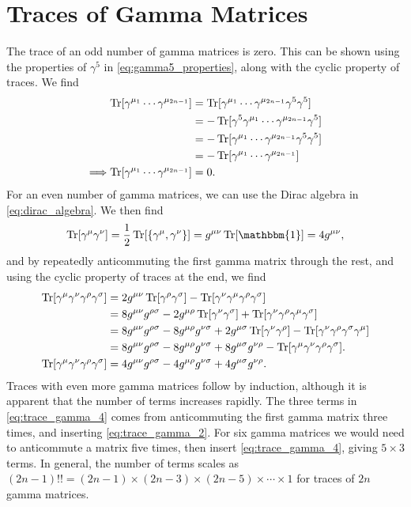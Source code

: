 \section{Traces of Gamma Matrices}\label{app:gamma_traces}
The trace of an odd number of gamma matrices is zero. This can be shown using the properties of $\gamma^5$ in \cref{eq:gamma5_properties}, along with the cyclic property of traces. We find
\begin{align}
    \operatorname{Tr}[\gamma^{\mu_1}\cdots\gamma^{\mu_{2n-1}}] &= \operatorname{Tr}[\gamma^{\mu_1}\cdots\gamma^{\mu_{2n-1}}\gamma^5\gamma^5]
    \nonumber \\
    &= -\operatorname{Tr}[\gamma^5\gamma^{\mu_1}\cdots\gamma^{\mu_{2n-1}}\gamma^5]
    \nonumber \\
    &= -\operatorname{Tr}[\gamma^{\mu_1}\cdots\gamma^{\mu_{2n-1}}\gamma^5\gamma^5]
    \nonumber \\
    &= -\operatorname{Tr}[\gamma^{\mu_1}\cdots\gamma^{\mu_{2n-1}}]
    \nonumber \\
    \Longrightarrow \operatorname{Tr}[\gamma^{\mu_1}\cdots\gamma^{\mu_{2n-1}}] &= 0.
\end{align}
For an even number of gamma matrices, we can use the Dirac algebra in \cref{eq:dirac_algebra}. We then find
\begin{equation}\label{eq:trace_gamma_2}
    \Tr[\gamma^\mu\gamma^\nu] = \frac{1}{2}\Tr[\{\gamma^\mu,\gamma^\nu\}] = g^{\mu\nu} \Tr[\mathbbm{1}] = 4g^{\mu\nu},
\end{equation}
and by repeatedly anticommuting the first gamma matrix through the rest, and using the cyclic property of traces at the end, we find
\begin{align}
    \operatorname{Tr}[\gamma^\mu\gamma^\nu\gamma^\rho\gamma^\sigma] &= 2g^{\mu\nu}\operatorname{Tr}[\gamma^\rho\gamma^\sigma] - \operatorname{Tr}[\gamma^\nu\gamma^\mu\gamma^\rho\gamma^\sigma]
    \nonumber \\
    &= 8g^{\mu\nu}g^{\rho\sigma} - 2g^{\mu\rho}\operatorname{Tr}[\gamma^\nu\gamma^\sigma] + \operatorname{Tr}[\gamma^\nu\gamma^\rho\gamma^\mu\gamma^\sigma]
    \nonumber \\
    &= 8g^{\mu\nu}g^{\rho\sigma} - 8g^{\mu\rho}g^{\nu\sigma} + 2g^{\mu\sigma} \operatorname{Tr}[\gamma^\nu\gamma^\rho] - \operatorname{Tr}[\gamma^\nu\gamma^\rho\gamma^\sigma\gamma^\mu]
    \nonumber \\
    &= 8g^{\mu\nu}g^{\rho\sigma} - 8g^{\mu\rho}g^{\nu\sigma} + 8g^{\mu\sigma}g^{\nu\rho} - \operatorname{Tr}[\gamma^\mu\gamma^\nu\gamma^\rho\gamma^\sigma].
    \nonumber \\
    \operatorname{Tr}[\gamma^\mu\gamma^\nu\gamma^\rho\gamma^\sigma] &= 4g^{\mu\nu}g^{\rho\sigma} - 4g^{\mu\rho}g^{\nu\sigma} + 4g^{\mu\sigma}g^{\nu\rho}.
    \label{eq:trace_gamma_4}
\end{align}
Traces with even more gamma matrices follow by induction, although it is apparent that the number of terms increases rapidly.
The three terms in \cref{eq:trace_gamma_4} comes from anticommuting the first gamma matrix three times, and inserting \cref{eq:trace_gamma_2}.
For six gamma matrices we would need to anticommute a matrix five times, then insert \cref{eq:trace_gamma_4}, giving $5\times3$ terms.
In general, the number of terms scales as $(2n-1)!! = (2n-1)\times(2n-3)\times(2n-5)\times\cdots\times1$ for traces of $2n$ gamma matrices.

